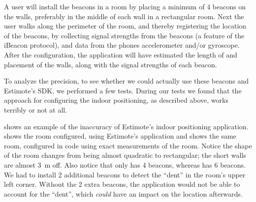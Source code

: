A user will install the beacons in a room by placing a minimum of \num{4} beacons on the walls, 
preferably in the middle of each wall in a rectangular room.   
Next the user walks along the perimeter of the room, 
and thereby registering the location of the beacons, 
by collecting signal strengths from the beacons (a feature of the iBeacon protocol), 
and data from the phones accelerometer and/or gyroscope.
After the configuration, the application will have estimated the length of and placement of the walls, 
along with the signal strengths of each beacon.

To analyze the precision, 
to see whether we could actually use these beacons and Estimote's SDK, 
we performed a few tests. 
During our tests we found that the approach for configuring the indoor positioning, 
as described above, 
works terribly or not at all. 

 shows an example of the inaccuracy of Estimote's indoor positioning application. 
 shows the room configured, 
using Estimote's application and  shows the same room, 
configured in code using exact measurements of the room. 
Notice the shape of the room changes from being almost quadratic to rectangular;
the short walls are almost \SI{3}{\meter} off.
Also notice that  only has \num{4} beacons, 
whereas  has \num{6} beacons. 
We had to install \num{2} additional beacons to detect the ``dent'' in the room's upper left corner. 
Without the \num{2} extra beacons, 
the application would not be able to account for the ``dent'',
which \emph{could} have an impact on the location afterwards. 

